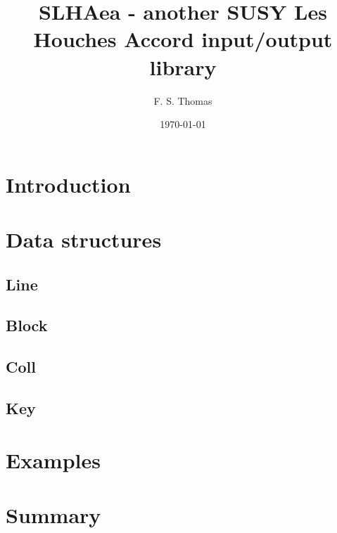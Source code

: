 \documentclass[
  11pt,
  ]{revtex4-1}
\begin{document}
\title{SLHAea - another SUSY Les Houches Accord input/output library}
\date{\today}

\author{F. S. Thomas}

\begin{abstract}
\end{abstract}

\maketitle
\tableofcontents

\section{Introduction\label{sec:introduction}}

\section{Data structures\label{sec:data_structures}}

\subsection{Line\label{ssec:line}}

\subsection{Block\label{ssec:block}}

\subsection{Coll\label{ssec:coll}}

\subsection{Key\label{ssec:key}}

\section{Examples\label{sec:examples}}

\section{Summary\label{sec:summary}}
\end{document}
